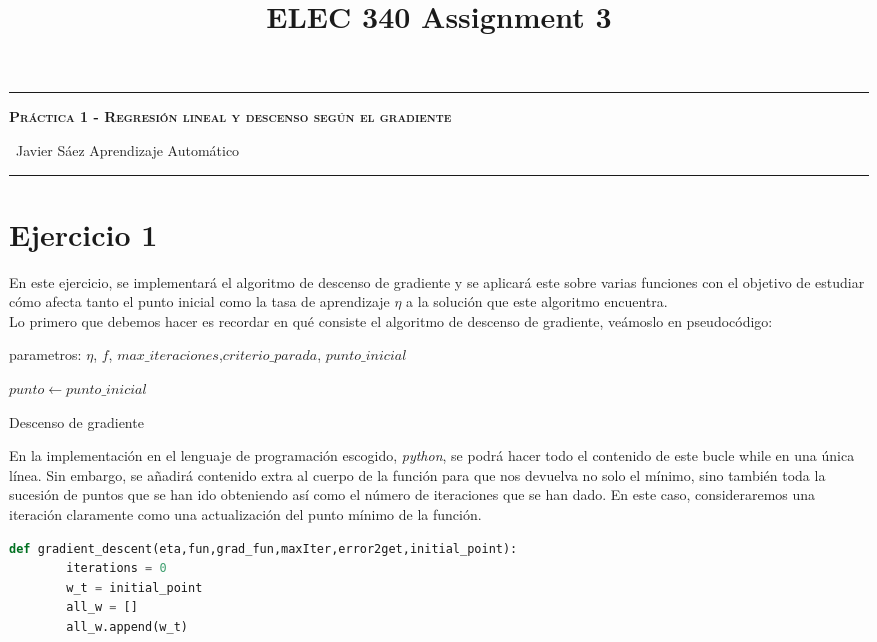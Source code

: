 \documentclass[12pt]{scrartcl}
\title{ELEC 340 Assignment 3}
\begin{document}
\begin{center}
	\hrule
	\vspace{.4cm}
	{\textbf { \large \scshape{ Práctica 1 - Regresión lineal y descenso según el gradiente}}}
\end{center}
{\ Javier Sáez \hspace{\fill} Aprendizaje Automático  \\
	\hrule

\section*{Ejercicio 1}

En este ejercicio, se implementará el algoritmo de descenso de gradiente y se aplicará
este sobre varias funciones con el objetivo de estudiar cómo afecta tanto el punto inicial 
como la tasa de aprendizaje $\eta$ a la solución que este algoritmo encuentra.\\

Lo primero que debemos hacer es recordar en qué consiste el algoritmo de descenso de gradiente,
 veámoslo en pseudocódigo:\\


\begin{algorithm}[H]
\SetAlgoLined
{}
 parametros: $\eta$, $f$, $max\_iteraciones$,$criterio\_parada$, $punto\_inicial$ \;

 $punto  \leftarrow punto\_inicial$ \;
 \caption{Descenso de gradiente}
\end{algorithm}

En la implementación en el lenguaje de programación escogido, \emph{python}, se podrá hacer todo el contenido de este bucle while en una única línea.
Sin embargo, se añadirá contenido extra al cuerpo de la función para que nos devuelva no solo el mínimo, sino también toda la sucesión de puntos
que se han ido obteniendo así como el número de iteraciones que se han dado. En este caso, consideraremos una iteración claramente como una actualización del punto mínimo
de la función. \\

\begin{lstlisting}[language=Python]
    def gradient_descent(eta,fun,grad_fun,maxIter,error2get,initial_point):
	    iterations = 0
	    w_t = initial_point
	    all_w = []
	    all_w.append(w_t)


\end{lstlisting}}
\end{document}
